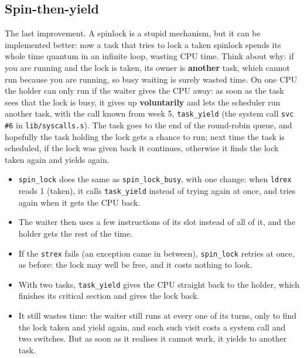 \subsection{Spin-then-yield}
The last improvement. A spinlock is a stupid mechanism, but it can be implemented better: now a task that tries to lock a taken spinlock spends its whole time quantum in an infinite loop, wasting CPU time. Think about why: if you are running and the lock is taken, its owner is \textbf{another} task, which cannot run because you are running, so busy waiting is surely wasted time. On one CPU the holder can only run if the waiter gives the CPU away: as soon as the task sees that the lock is busy, it gives up \textbf{voluntarily} and lets the scheduler run another task, with the call known from week 5, \texttt{task\_yield} (the system call \texttt{svc \#6} in \texttt{lib/syscalls.s}). The task goes to the end of the round-robin queue, and hopefully the task holding the lock gets a chance to run; next time the task is scheduled, if the lock was given back it continues, otherwise it finds the lock taken again and yields again.
\begin{itemize}
    \item \texttt{spin\_lock} does the same as \texttt{spin\_lock\_busy}, with one change: when \texttt{ldrex} reads 1 (taken), it calls \texttt{task\_yield} instead of trying again at once, and tries again when it gets the CPU back.
    \item The waiter then uses a few instructions of its slot instead of all of it, and the holder gets the rest of the time.
    \item If the \texttt{strex} fails (an exception came in between), \texttt{spin\_lock} retries at once, as before: the lock may well be free, and it costs nothing to look.
    \item With two tasks, \texttt{task\_yield} gives the CPU straight back to the holder, which finishes its critical section and gives the lock back.
    \item It still wastes time: the waiter still runs at every one of its turns, only to find the lock taken and yield again, and each such visit costs a system call and two switches. But as soon as it realises it cannot work, it yields to another task.
\end{itemize}

